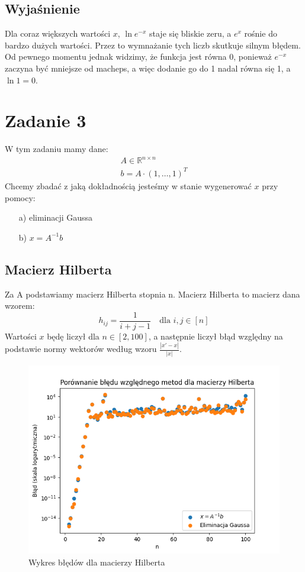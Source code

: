 \documentclass{article}
\begin{document}
\subsection*{Wyjaśnienie}
Dla coraz większych wartości $x$, $\ln{e^{-x}}$ staje się bliskie zeru,
a $e^x$ rośnie do bardzo dużych wartości. Przez to wymnażanie tych liczb skutkuje
silnym błędem. Od pewnego momentu jednak widzimy, że funkcja jest równa 0, ponieważ
$e^{-x}$ zaczyna być mniejsze od macheps, a więc dodanie
go do 1 nadal równa się 1, a $\ln{1} = 0$.





\section*{Zadanie 3}
W tym zadaniu mamy dane:
\begin{gather*}
A \in \mathbb{R}^{n \times n}\\
b = A \cdot {(1,\dots,1)}^T
\end{gather*}
Chcemy zbadać z jaką dokładnością jesteśmy w stanie
wygenerować $x$ przy pomocy:
\begin{enumerate}
  \item[a)] eliminacji Gaussa
  \item[b)] $x=A^{-1}b$
\end{enumerate}

\subsection*{Macierz Hilberta}
Za A podstawiamy macierz Hilberta stopnia n.
Macierz Hilberta to macierz dana wzorem:
\[h_{ij} = \frac{1}{i + j - 1} \quad \text{dla } i, j \in [n]\]
Wartości $x$ będę liczył dla $n \in [2,100]$,
a następnie liczył błąd względny na podstawie
normy wektorów według wzoru
$
  \frac{|x\prime - x|}{|x|}  
$.
\begin{figure}[H]
  \centering
  \includegraphics[width=\textwidth]{../images/hilbert.png}
  \caption{Wykres błędów dla macierzy Hilberta}
\end{figure}
\end{document}
